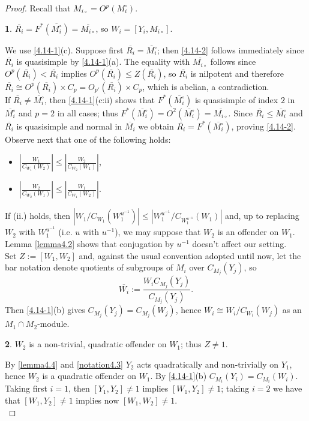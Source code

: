 \documentclass{amsart}
\numberwithin{equation}{section}
\theoremstyle{definition}
\theoremstyle{subresult}
\newtheorem{subresult}{}[equation]
\theoremstyle{caseresult}
\newcommand{\ov}{\overline}
\newcommand{\inv}{^{-1}}
\newcommand{\<}{\langle}
\renewcommand{\>}{\rangle}
\begin{document}
\begin{proof}
	Recall that $M_{i\circ} = O^p(M_i^\circ)$.
	\begin{subresult}\label{4.14-2}
		$\ov{R_i}=F^*(\ov{M_i^\circ})=\ov{M_{i\circ}}$, so $W_i=[Y_i,M_{i\circ}]$.
	\end{subresult}
	We use \eqref{4.14-1}(c). Suppose first $\ov{R_i} = \ov{M_i^\circ}$; then \eqref{4.14-2} follows immediately since $\ov{R_i}$ is quasisimple by \eqref{4.14-1}(a). The equality with $\ov{M_{i \circ}}$ follows since $O^p(\ov{R_i}) < \ov{R_i}$ implies $O^p(\ov{R_i}) \le Z(\ov{R_i})$, so $\ov{R_i}$ is nilpotent and therefore $\ov{R_i} \cong O^p(\ov{R_i}) \times C_p = O_{p'}(\ov{R_i}) \times C_p$, which is abelian, a contradiction.  \\
	If $\ov{R_i} \ne \ov{M_i^\circ}$, then \eqref{4.14-1}(c:ii) shows that $F^*(\ov{M_i^\circ})$ is quasisimple of index $2$ in $\ov{M_i^\circ}$ and $p=2$ in all cases; thus $F^*(\ov{M_i^\circ}) = O^2(\ov{M_i^\circ}) =\ov{M_{i\circ}}$. Since $\ov{R_i} \le \ov{M_i^\circ}$ and $\ov{R_i}$ is quasisimple and normal in $\ov{M_i}$ we obtain $\ov{R_i} = F^*(\ov{M_i^\circ})$, proving \eqref{4.14-2}.\\
	
	Observe next that one of the following holds:
	\begin{itemize}
		\item[i.] $\displaystyle \left| \frac{W_1}{C_{W_1}(W_2)} \right| \le \left| \frac{W_2}{C_{W_2}(W_1)} \right|$,
		\vspace{0.1cm}
		\item[ii.] $\displaystyle \left| \frac{W_2}{C_{W_2}(W_1)} \right| \le \left| \frac{W_1}{C_{W_1}(W_2)} \right|$.
	\end{itemize}
	If (ii.) holds, then $|W_1/C_{W_1}(W_1^{u\inv})| \le |W_1^{u\inv} / C_{W_1^{u\inv}}(W_1) |$ and, up to replacing $W_2$ with $W_1^{u\inv}$ (i.e. $u$ with $u\inv$), we may suppose that $W_2$ is an offender on $W_1$. Lemma \ref{lemma4.2} shows that conjugation by $u\inv$ doesn't affect our setting. \\
	
	Set $Z:=[W_1,W_2]$ and, against the usual convention adopted until now, let the bar notation denote quotients of subgroups of $M_i$ over $C_{M_j}(Y_j)$, so
	\[
	\ov{W_i} := \frac{W_i C_{M_j}(Y_j)}{C_{M_j}(Y_j)}.
	\]
	Then \eqref{4.14-1}(b) gives $C_{M_j}(Y_j)=C_{M_j}(W_j)$, hence $\ov{W_i} \cong W_i/C_{W_i}(W_j)$ as an $M_1 \cap M_2$-module.
	
	\begin{subresult}\label{4.14-3}
		$W_2$ is a non-trivial, quadratic offender on $W_1$; thus $Z \ne 1$.
	\end{subresult}
	By \ref{lemma4.4} and \ref{notation4.3} $Y_2$ acts quadratically and non-trivially on $Y_1$, hence $W_2$ is a quadratic offender on $W_1$. By \eqref{4.14-1}(b) $C_{M_i}(Y_i) =C_{M_i}(W_i)$. Taking first $i=1$, then $[Y_1,Y_2] \ne 1$ implies $[W_1,Y_2] \ne 1$; taking $i=2$ we have that $[W_1,Y_2] \ne 1$ implies now $[W_1,W_2]\ne 1$.\\
	

\end{proof}
\end{document}
